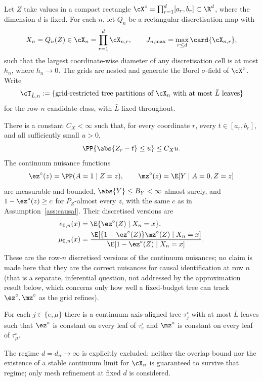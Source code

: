 \begin{assumption}\label{ass:mesh}
Let $Z$ take values in a compact rectangle
$\cX^\circ=\prod_{r=1}^{d}[a_r,b_r]\subset\R^d$, where the dimension $d$ is
fixed.  For each $n$, let $Q_n$ be a rectangular discretisation map with
\[
  X_n=Q_n(Z)\in\cX_n=\prod_{r=1}^{d}\cX_{n,r},
  \qquad
  J_{n,\max}=\max_{r\le d}\card{\cX_{n,r}},
\]
such that the largest coordinate-wise diameter of any discretisation cell is
at most $h_n$, where $h_n\longrightarrow0$.  The grids are nested and generate
the Borel $\sigma$-field of $\cX^\circ$.  Write
\[
  \cT_{\bar L,n}
  :=\{\text{grid-restricted tree partitions of $\cX_n$ with at most
  $\bar L$ leaves}\}
\]
for the row-$n$ candidate class, with $\bar L$ fixed throughout.

There is a constant $C_X<\infty$ such that, for every coordinate $r$, every
$t\in[a_r,b_r]$, and all sufficiently small $u>0$,
\begin{equation}\label{eq:mesh-slab}
  \PP\{\abs{Z_r-t}\le u\}\le C_Xu .
\end{equation}
The continuum nuisance functions
\[
  \ez^\circ(z)=\PP(A=1\mid Z=z),
  \qquad
  \mz^\circ(z)=\E[Y\mid A=0,Z=z]
\]
are measurable and bounded, $\abs{Y}\le B_Y<\infty$ almost surely, and
$1-\ez^\circ(z)\ge c$ for $P_Z$-almost every $z$, with the same $c$ as in
Assumption~\ref{ass:causal}.  Their discretised versions are
\begin{align}
  \ezn(x)
  &=\E\{\ez^\circ(Z)\mid X_n=x\},
  \label{eq:mesh-en}\\
  \mzn(x)
  &=\frac{\E[\{1-\ez^\circ(Z)\}\mz^\circ(Z)\mid X_n=x]}
          {\E[1-\ez^\circ(Z)\mid X_n=x]} .
  \label{eq:mesh-mun}
\end{align}
These are the row-$n$ discretised versions of the continuum nuisances; no
claim is made here that they are the correct nuisances for causal
identification at row $n$ (that is a separate, inferential question, not
addressed by the approximation result below, which concerns only how well a
fixed-budget tree can track $\ez^\circ,\mz^\circ$ as the grid refines).

For each $j\in\{e,\mu\}$ there is a continuum axis-aligned tree
$\tau_j^\circ$ with at most $\bar L$ leaves such that
$\ez^\circ$ is constant on every leaf of $\tau_e^\circ$ and
$\mz^\circ$ is constant on every leaf of $\tau_\mu^\circ$.

The regime $d=d_n\to\infty$ is explicitly excluded: neither the overlap bound
nor the existence of a stable continuum limit for $\cX_n$ is guaranteed to
survive that regime; only mesh refinement at fixed $d$ is considered.
\end{assumption}

